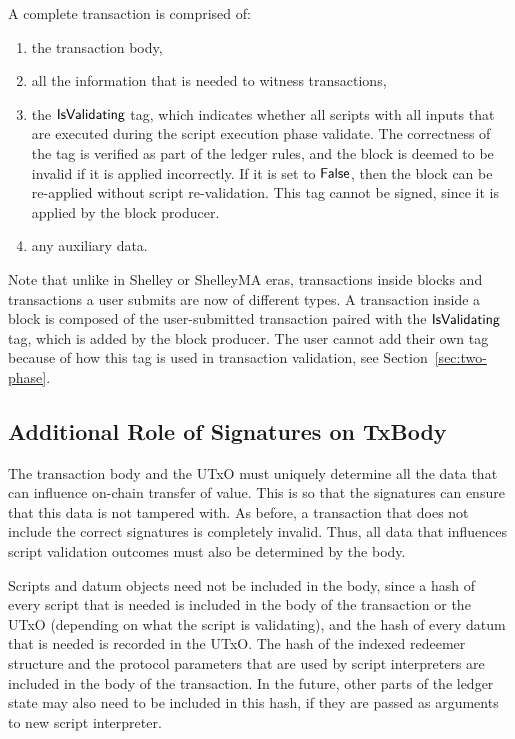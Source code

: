 A complete transaction is comprised of:

\begin{enumerate}
  \item the transaction body,
  \item all the information that is needed to witness transactions,
  \item the $\mathsf{IsValidating}$ tag, which indicates whether all scripts with all inputs
  that are executed during the script execution phase validate.
  The correctness of the tag is verified as part of the ledger rules, and the block is
  deemed to be invalid if it is applied incorrectly.
  If it is set to $\mathsf{False}$, then the block can be re-applied without script re-validation.
  This tag cannot be signed, since it is applied by the block producer.
  \item any auxiliary data.
\end{enumerate}

Note that unlike in Shelley or ShelleyMA eras, transactions inside blocks and transactions
a user submits are now of different types. A transaction inside a block is composed of
the user-submitted transaction paired with the $\mathsf{IsValidating}$ tag, which is
added by the block producer. The user cannot
add their own tag because of how this tag is used in transaction validation, see
Section~\ref{sec:two-phase}.

\subsection{Additional Role of Signatures on TxBody}

The transaction body and the UTxO must uniquely determine all the data
that can influence on-chain transfer of value.
This is so that the signatures can ensure that this data is not tampered with.
As before, a transaction that does not include the correct signatures is completely invalid.
Thus, all data that influences script validation outcomes must also be determined by the body.

Scripts and datum objects need not be included in the body,
since a hash of every script that is needed
is included in the body of the transaction or the UTxO (depending on what the script is validating),
and the hash of every datum that is needed is recorded in the UTxO.
%
The hash of the indexed redeemer structure and the protocol parameters that are used by
script interpreters are included in the body of the transaction. In the future, other parts of the ledger
state may also need to be included in this hash, if they are passed as
arguments to new script interpreter.

